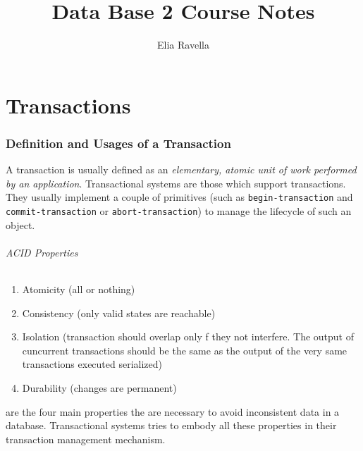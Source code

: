 \documentclass{article}
\title{Data Base 2 Course Notes}
\author{Elia Ravella}
\begin{document}
	\begin{titlepage}
		\maketitle
	\end{titlepage}
	
	\tableofcontents
	\clearpage

	\clearpage
	\part{Transactions}
		\section{Definition and Usages of a Transaction}
			A transaction is usually defined as an \textit{elementary, atomic unit of work  performed by an application}. Transactional systems are those which support transactions. They usually implement a couple of primitives (such as \verb|begin-transaction| and \verb|commit-transaction| or \verb|abort-transaction|) to manage the lifecycle of such an object.

			\paragraph{ACID Properties}
				\begin{enumerate}
					\item Atomicity (all or nothing)
					\item Consistency (only valid states are reachable)
					\item Isolation (transaction should overlap only f they not interfere. The output of cuncurrent transactions should be the same as the output of the very same transactions executed serialized)
					\item Durability (changes are permanent)
				\end{enumerate}
				are the four main properties the are necessary to avoid inconsistent data in a database. Transactional systems tries to embody all these properties in their transaction management mechanism.
\end{document}
